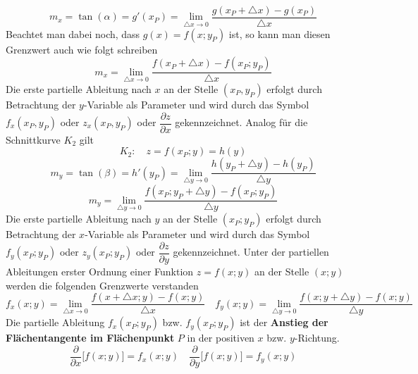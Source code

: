 \begin{equation}
\boxed{m_x=\tan\left(\alpha\right)=g'\left(x_P\right)=\displaystyle \lim_{\triangle x\rightarrow 0}\dfrac{g\left(x_P+\triangle x\right)-g\left(x_P\right)}{\triangle x}}
\end{equation}
Beachtet man dabei noch, dass $g\left(x\right)=f\left(x; y_P\right)$ ist, so kann man diesen Grenzwert auch wie folgt schreiben
\begin{equation}
\boxed{m_x=\displaystyle \lim_{\triangle x\rightarrow 0}\dfrac{f\left(x_P+\triangle x\right)-f\left(x_P; y_P\right)}{\triangle x}}
\end{equation}
Die erste partielle Ableitung nach $x$ an der Stelle $\left(x_P, y_P\right)$ erfolgt durch Betrachtung der $y$-Variable als Parameter und wird durch das Symbol $f_x\left(x_P, y_P\right)$ oder $z_x\left(x_P, y_P\right)$ oder $\dfrac{\partial z}{\partial x}$ gekennzeichnet.
\newline\newline
Analog für die Schnittkurve $K_2$ gilt 
\begin{equation} 
\boxed{K_2:\quad z=f\left(x_P; y\right)=h\left(y\right)}
\end{equation} 
\begin{equation}
\boxed{m_y=\tan\left(\beta\right)=h'\left(y_P\right)=\displaystyle \lim_{\triangle y\rightarrow 0}\dfrac{h\left(y_P+\triangle y\right)-h\left(y_P\right)}{\triangle y}}
\end{equation}
\begin{equation}
\boxed{m_y=\displaystyle \lim_{\triangle y\rightarrow 0}\dfrac{f\left(x_P; y_P+\triangle y\right)-f\left(x_P; y_P\right)}{\triangle y}}
\end{equation}
Die erste partielle Ableitung nach $y$ an der Stelle $\left(x_P; y_P\right)$ erfolgt durch Betrachtung der $x$-Variable als Parameter und wird durch das Symbol $f_y\left(x_P; y_P\right)$ oder $z_y\left(x_P; y_P\right)$ oder $\dfrac{\partial z}{\partial y}$ gekennzeichnet.
\newline\newline
Unter der partiellen Ableitungen erster Ordnung einer Funktion $z=f\left(x; y\right)$ an der Stelle $\left(x; y\right)$ werden die folgenden Grenzwerte verstanden
\begin{equation}
\boxed{f_x\left(x; y\right)=\displaystyle \lim_{\triangle x\rightarrow 0}\dfrac{f\left(x+\triangle x; y\right)-f\left(x; y\right)}{\triangle x}}\quad \boxed{f_y\left(x; y\right)=\displaystyle \lim_{\triangle y\rightarrow 0}\dfrac{f\left(x; y+\triangle y\right)-f\left(x; y\right)}{\triangle y}}
\end{equation}
Die partielle Ableitung $f_x\left(x_P; y_P\right)$ bzw. $f_y\left(x_P; y_P\right)$ ist der \textbf{Anstieg der Flächentangente im Flächenpunkt} $P$ in der positiven $x$ bzw. $y$-Richtung.
\begin{equation}
\boxed{\dfrac{\partial}{\partial x}\Big[f\left(x; y\right)\Big]=f_x\left(x; y\right)}\quad \boxed{\dfrac{\partial}{\partial y}\Big[f\left(x; y\right)\Big]=f_y\left(x; y\right)}
\end{equation}
